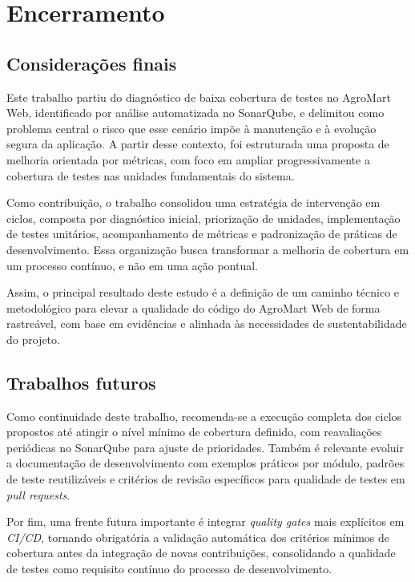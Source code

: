 \chapter{Encerramento}

\section{Considerações finais}

Este trabalho partiu do diagnóstico de baixa cobertura de testes no AgroMart Web, identificado por análise automatizada no SonarQube, e delimitou como problema central o risco que esse cenário impõe à manutenção e à evolução segura da aplicação. A partir desse contexto, foi estruturada uma proposta de melhoria orientada por métricas, com foco em ampliar progressivamente a cobertura de testes nas unidades fundamentais do sistema.

Como contribuição, o trabalho consolidou uma estratégia de intervenção em ciclos, composta por diagnóstico inicial, priorização de unidades, implementação de testes unitários, acompanhamento de métricas e padronização de práticas de desenvolvimento. Essa organização busca transformar a melhoria de cobertura em um processo contínuo, e não em uma ação pontual.

Assim, o principal resultado deste estudo é a definição de um caminho técnico e metodológico para elevar a qualidade do código do AgroMart Web de forma rastreável, com base em evidências e alinhada às necessidades de sustentabilidade do projeto.

\section{Trabalhos futuros}

Como continuidade deste trabalho, recomenda-se a execução completa dos ciclos propostos até atingir o nível mínimo de cobertura definido, com reavaliações periódicas no SonarQube para ajuste de prioridades.
Também é relevante evoluir a documentação de desenvolvimento com exemplos práticos por módulo, padrões de teste reutilizáveis e critérios de revisão específicos para qualidade de testes em \textit{pull requests}.

Por fim, uma frente futura importante é integrar \textit{quality gates} mais explícitos em \textit{CI/CD}, tornando obrigatória a validação automática dos critérios mínimos de cobertura antes da integração
de novas contribuições, consolidando a qualidade de testes como requisito contínuo do processo de desenvolvimento.
